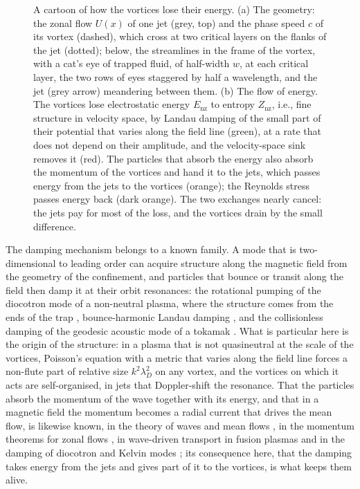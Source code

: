 \documentclass{jpp}
\newcommand{\lambdaD}{\lambda_D}
\newcommand{\Enz}{E_\text{nz}}
\newcommand{\Znz}{Z_\text{nz}}
\begin{document}
\begin{figure}
\centering

\caption{A cartoon of how the vortices lose their energy. (a) The geometry: the zonal flow \(U(x)\) of one jet (grey, top) and the phase speed \(c\) of its vortex (dashed), which cross at two critical layers on the flanks of the jet (dotted); below, the streamlines in the frame of the vortex, with a cat's eye of trapped fluid, of half-width \(w\), at each critical layer, the two rows of eyes staggered by half a wavelength, and the jet (grey arrow) meandering between them. (b) The flow of energy. The vortices lose electrostatic energy \(\Enz\) to entropy \(\Znz\), i.e., fine structure in velocity space, by Landau damping of the small part of their potential that varies along the field line (green), at a rate that does not depend on their amplitude, and the velocity-space sink removes it (red). The particles that absorb the energy also absorb the momentum of the vortices and hand it to the jets, which passes energy from the jets to the vortices (orange); the Reynolds stress passes energy back (dark orange). The two exchanges nearly cancel: the jets pay for most of the loss, and the vortices drain by the small difference.}
\label{fig:cartoon}
\end{figure}

The damping mechanism belongs to a known family. A mode that is two-dimensional to leading order can acquire structure along the magnetic field from the geometry of the confinement, and particles that bounce or transit along the field then damp it at their orbit resonances: the rotational pumping of the diocotron mode of a non-neutral plasma, where the structure comes from the ends of the trap \citep{CrooksONeil1995}, bounce-harmonic Landau damping \citep{BerkBook1969, Anderegg2016}, and the collisionless damping of the geodesic acoustic mode of a tokamak \citep{SugamaWatanabe2006GAM}. What is particular here is the origin of the structure: in a plasma that is not quasineutral at the scale of the vortices, Poisson's equation with a metric that varies along the field line forces a non-flute part of relative size \(k^2\lambdaD^2\) on any vortex, and the vortices on which it acts are self-organised, in jets that Doppler-shift the resonance. That the particles absorb the momentum of the wave together with its energy, and that in a magnetic field the momentum becomes a radial current that drives the mean flow, is likewise known, in the theory of waves and mean flows \citep{AndrewsMcIntyre1976, Buhler2014}, in the momentum theorems for zonal flows \citep{Diamond2008}, in wave-driven transport in fusion plasmas \citep{FischRax1992} and in the damping of diocotron and Kelvin modes \citep{CrooksONeil1995, Kabantsev2014}; its consequence here, that the damping takes energy from the jets and gives part of it to the vortices, is what keeps them alive.
\end{document}
